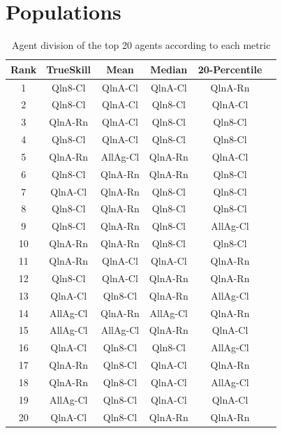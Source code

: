 \section{Populations}
\begin{table}[H]
\centering
\begin{tabular}{|| c | c | c | c | c | c ||} 
 \hline
 Rank & TrueSkill & Mean & Median & 20-Percentile \\ [0.5ex] 
 \hline\hline
   1 &   Qln8-Cl &   QlnA-Cl &   QlnA-Cl &       QlnA-Rn \\
   2 &   Qln8-Cl &   QlnA-Cl &   Qln8-Cl &       QlnA-Cl \\
   3 &   QlnA-Rn &   QlnA-Cl &   Qln8-Cl &       Qln8-Cl \\
   4 &   Qln8-Cl &   QlnA-Cl &   Qln8-Cl &       Qln8-Cl \\
   5 &   QlnA-Rn &  AllAg-Cl &   QlnA-Rn &       QlnA-Cl \\
   6 &   Qln8-Cl &   QlnA-Rn &   QlnA-Rn &       Qln8-Cl \\
   7 &   QlnA-Cl &   QlnA-Rn &   Qln8-Cl &       Qln8-Cl \\
   8 &   Qln8-Cl &   QlnA-Rn &   Qln8-Cl &       Qln8-Cl \\
   9 &   Qln8-Cl &   QlnA-Rn &   Qln8-Cl &      AllAg-Cl \\
  10 &   QlnA-Rn &   QlnA-Rn &   Qln8-Cl &       Qln8-Cl \\
  11 &   QlnA-Rn &   QlnA-Cl &   QlnA-Cl &       QlnA-Rn \\
  12 &   Qln8-Cl &   QlnA-Cl &   QlnA-Rn &       QlnA-Rn \\
  13 &   QlnA-Cl &   Qln8-Cl &   QlnA-Rn &      AllAg-Cl \\
  14 &  AllAg-Cl &   QlnA-Rn &  AllAg-Cl &       QlnA-Rn \\
  15 &  AllAg-Cl &  AllAg-Cl &   QlnA-Rn &       QlnA-Cl \\
  16 &   QlnA-Cl &   Qln8-Cl &   Qln8-Cl &      AllAg-Cl \\
  17 &   QlnA-Rn &   Qln8-Cl &   QlnA-Cl &       QlnA-Rn \\
  18 &   QlnA-Rn &   Qln8-Cl &   QlnA-Cl &      AllAg-Cl \\
  19 &  AllAg-Cl &   Qln8-Cl &   QlnA-Cl &       QlnA-Cl \\
  20 &   QlnA-Cl &   Qln8-Cl &   QlnA-Rn &       QlnA-Rn \\ [1ex] 
 \hline
\end{tabular}
\label{DivisionRankings}
\caption{Agent division of the top 20 agents according to each metric}
\end{table}

